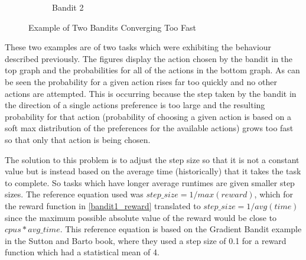 \begin{figure}[ht]
\begin{subfigure}{.5\textwidth}
  \caption{Bandit 2}
\end{subfigure}
\caption{Example of Two Bandits Converging Too Fast}
\label{fig:old_bandits}
\end{figure}

These two examples are of two tasks which were exhibiting the behaviour described previously. The figures display the action chosen by the bandit in the top graph and the probabilities for all of the actions in the bottom graph. As can be seen the probability for a given action rises far too quickly and no other actions are attempted. This is occurring because the step taken by the bandit in the direction of a single actions preference is too large and the resulting probability for that action (probability of choosing a given action is based on a soft max distribution of the preferences for the available actions) grows too fast so that only that action is being chosen. 

The solution to this problem is to adjust the step size so that it is not a constant value but is instead based on the average time (historically) that it takes the task to complete. So tasks which have longer average runtimes are given smaller step sizes. The reference equation used was $step\_size = 1/max(reward)$, which for the reward function in \ref{bandit1_reward} translated to $step\_size = 1/avg(time)$ since the maximum possible absolute value of the reward would be close to $cpus*avg\_time$. This reference equation is based on the Gradient Bandit example in the Sutton and Barto book, where they used a step size of 0.1 for a reward function which had a statistical mean of 4.  

